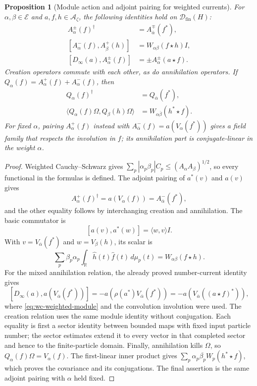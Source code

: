 \documentclass[11pt]{article}
\newtheorem{proposition}[theorem]{Proposition}
\theoremstyle{definition}
\theoremstyle{remark}
\numberwithin{equation}{section}
\newcommand{\cA}{\mathcal A}
\newcommand{\R}{\mathbb R}
\begin{document}
\begin{proposition}[Module action and adjoint pairing for weighted currents]
\label{prop:wc-weighted-current}
For $\alpha,\beta\in\mathcal E$ and $a,f,h\in\cA_\zeta$, the
following identities hold on $\mathcal D_{\mathrm{fin}}(H)$:
\begin{equation}
 \begin{aligned}
 A_\alpha^\pm(f)^\dagger&=A_{\overline\alpha}^{\mp}(f^*),\\
 [A_\alpha^-(f),A_\beta^+(h)]&=W_{\alpha\beta}(f\star h)I,\\
 [D_\infty(a),A_\alpha^\pm(f)]&=\pm A_\alpha^\pm(a\star f).
 \end{aligned}
 \label{eq:wc-weighted-current-relations}
\end{equation}
Creation operators commute with each other, as do annihilation operators.
If $Q_\alpha(f)=A_\alpha^+(f)+A_\alpha^-(f)$, then
\begin{equation}
 \begin{aligned}
 Q_\alpha(f)^\dagger&=Q_{\overline\alpha}(f^*),\\
 \langle Q_\alpha(f)\Omega,Q_\beta(h)\Omega\rangle
 &=W_{\alpha\overline\beta}(h^*\star f).
 \end{aligned}
 \label{eq:wc-weighted-vacuum}
\end{equation}
For fixed $\alpha$, pairing $A_\alpha^+(f)$ instead with
$A_{\overline\alpha}^-(f)=a(V_\alpha(f^*))$ gives a field family
that respects the involution in $f$; its annihilation part is
conjugate-linear in the weight $\alpha$.
\end{proposition}
\begin{proof}
Weighted Cauchy--Schwarz gives
$\sum_p|\alpha_p\beta_p|C_p\leq
(A_\alpha A_\beta)^{1/2}$, so every functional in the formulas is defined.
The adjoint pairing of $a^*(v)$ and $a(v)$ gives
\[
 A_\alpha^+(f)^\dagger=a(V_\alpha(f))
 =A_{\overline\alpha}^-(f^*),
\]
and the other equality follows by interchanging creation and annihilation.
The basic commutator is
\[
 [a(v),a^*(w)]=\langle w,v\rangle I.
\]
With $v=V_{\overline\alpha}(f^*)$ and $w=V_\beta(h)$, its scalar is
\[
 \sum_p\beta_p\alpha_p
     \int_\R\widehat h(t)\widehat f(t)\,d\mu_p(t)
 =W_{\alpha\beta}(f\star h).
\]
For the mixed annihilation relation, the already proved number-current
identity gives
\[
 [D_\infty(a),a(V_{\overline\alpha}(f^*))]
 =-a(\rho(a^*)V_{\overline\alpha}(f^*))
 =-a(V_{\overline\alpha}((a\star f)^*)),
\]
where \eqref{eq:wc-weighted-module} and the convolution involution were used.
The creation relation uses the same module identity without conjugation.
Each equality is first a sector identity between bounded maps with fixed
input particle number; the sector estimates extend it to every vector
in that completed sector and hence to the finite-particle domain.
Finally, annihilation kills $\Omega$, so
$Q_\alpha(f)\Omega=V_\alpha(f)$.
The first-linear inner product gives
$\sum_p\alpha_p\overline{\beta_p}W_p(h^*\star f)$,
which proves the covariance and its conjugations.
The final assertion is the same adjoint pairing with $\alpha$ held fixed.
\end{proof}
\end{document}
